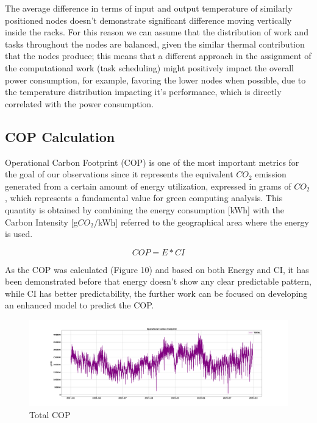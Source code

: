 The average difference in terms of input and output temperature of similarly positioned nodes doesn’t demonstrate significant difference moving vertically inside the racks.
For this reason we can assume that the distribution of work and tasks throughout the nodes are balanced, given the similar thermal contribution that the nodes produce;
this means that a different approach in the assignment of the computational work (task scheduling) might positively impact the overall power consumption, for example, favoring the lower nodes when possible, due to the temperature distribution impacting it’s performance, which is directly correlated with the power consumption.

\subsection{COP Calculation}
Operational Carbon Footprint (COP) is one of the most important metrics for the goal of our observations since it represents the equivalent $CO_2$ emission generated from a certain amount of energy utilization, expressed in grams of $CO_2$, which represents a fundamental value for green computing analysis.
This quantity is obtained by combining the energy consumption [kWh] with the Carbon Intensity [g$CO_2$/kWh] referred to the geographical area where the energy is used.

\[ COP = E * CI\]

As the COP was calculated (Figure 10) and based on both Energy and CI, it has been demonstrated before that energy doesn’t show any clear predictable pattern, while CI has better predictability, the further work can be focused on developing an enhanced model to predict the COP.

\begin{figure}[H]
    \centering
    \includegraphics[width=1\textwidth]{Figures/COP_Total.png}
    \caption{Total COP}
    \label{fig:COP}
\end{figure}

